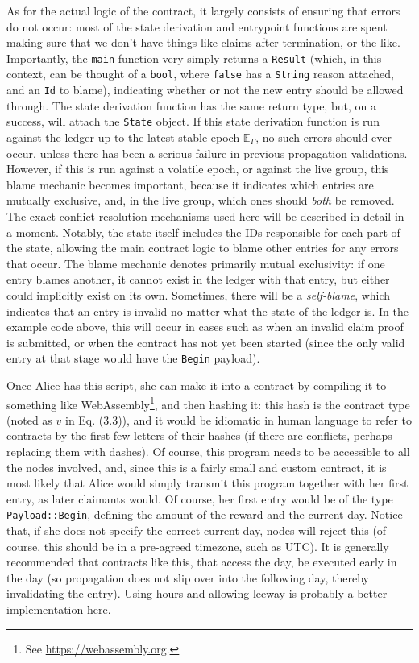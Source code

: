 \documentclass{extreport}
\begin{document}
As for the actual logic of the contract, it largely consists of ensuring that errors do not occur: most of the state derivation and entrypoint functions are spent making sure that we don't have things like claims after termination, or the like. Importantly, the \texttt{main} function very simply returns a \texttt{Result} (which, in this context, can be thought of a \texttt{bool}, where \texttt{false} has a \texttt{String} reason attached, and an \texttt{Id} to blame), indicating whether or not the new entry should be allowed through. The state derivation function has the same return type, but, on a success, will attach the \texttt{State} object. If this state derivation function is run against the ledger up to the latest stable epoch \(\mathbb{E}_\Gamma\), no such errors should ever occur, unless there has been a serious failure in previous propagation validations. However, if this is run against a volatile epoch, or against the live group, this blame mechanic becomes important, because it indicates which entries are mutually exclusive, and, in the live group, which ones should \emph{both} be removed. The exact conflict resolution mechanisms used here will be described in detail in a moment. Notably, the state itself includes the IDs responsible for each part of the state, allowing the main contract logic to blame other entries for any errors that occur. The blame mechanic denotes primarily mutual exclusivity: if one entry blames another, it cannot exist in the ledger with that entry, but either could implicitly exist on its own. Sometimes, there will be a \emph{self-blame}, which indicates that an entry is invalid no matter what the state of the ledger is. In the example code above, this will occur in cases such as when an invalid claim proof is submitted, or when the contract has not yet been started (since the only valid entry at that stage would have the \texttt{Begin} payload).

Once Alice has this script, she can make it into a contract by compiling it to something like WebAssembly\footnote{See \url{https://webassembly.org}.}, and then hashing it: this hash is the contract type (noted as \(v\) in Eq. (3.3)), and it would be idiomatic in human language to refer to contracts by the first few letters of their hashes (if there are conflicts, perhaps replacing them with dashes). Of course, this program needs to be accessible to all the nodes involved, and, since this is a fairly small and custom contract, it is most likely that Alice would simply transmit this program together with her first entry, as later claimants would. Of course, her first entry would be of the type \texttt{Payload::Begin}, defining the amount of the reward and the current day. Notice that, if she does not specify the correct current day, nodes will reject this (of course, this should be in a pre-agreed timezone, such as UTC). It is generally recommended that contracts like this, that access the day, be executed early in the day (so propagation does not slip over into the following day, thereby invalidating the entry). Using hours and allowing leeway is probably a better implementation here.
\end{document}
